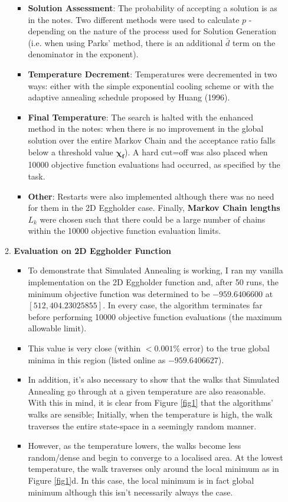 \documentclass[12pt]{article}
\begin{document}
\begin{enumerate}
\begin{enumerate}
\begin{itemize}
		\item \textbf{Solution Assessment}: The probability of accepting a solution is as in the notes. Two different methods were used to calculate $p$ - depending on the nature of the process used for Solution Generation (i.e. when using Parks' method, there is an additional $\bar{d}$ term on the denominator in the exponent).
		\item \textbf{Temperature Decrement}: Temperatures were decremented in two ways: either with the simple exponential cooling scheme or with the adaptive annealing schedule proposed by Huang (1996).
		\item \textbf{Final Temperature}: The search is halted with the enhanced method in the notes: when there is no improvement in the global solution over the entire Markov Chain and the acceptance ratio falls below a threshold value $\bm{\chi_{f}}$). A hard cut=off was also placed when 10000 objective function evaluations had occurred, as specified by the task. 
		\item \textbf{Other}: Restarts were also implemented although there was no need for them in the 2D Eggholder case. Finally, \textbf{Markov Chain lengths} $L_{k}$ were chosen such that there could be a large number of chains within the 10000 objective function evaluation limits.
	\end{itemize}
	\item \textbf{Evaluation on 2D Eggholder Function}
	\begin{itemize}
		\item To demonstrate that Simulated Annealing is working, I ran my vanilla implementation on the 2D Eggholder function and, after 50 runs, the minimum objective function was determined to be $-959.6406600$ at $[512, 404.23025855]$. In every case, the algorithm terminates far before performing 10000 objective function evaluations (the maximum allowable limit).
		\item This value is very close (within $< 0.001\%$ error) to the true global minima in this region (listed online as $−959.6406627$).
		\item In addition, it's also necessary to show that the walks that Simulated Annealing go through at a given temperature are also reasonable. With this in mind, it is clear from Figure \ref{fig1} that the algorithms' walks are sensible; Initially, when the temperature is high, the walk traverses the entire state-space in a seemingly random manner.
		\item However, as the temperature lowers, the walks become less random/dense and begin to converge to a localised area. At the lowest temperature, the walk traverses only  around the local minimum as in Figure \ref{fig1}d. In this case, the local minimum is in fact global minimum although this isn't necessarily always the case. 

\end{itemize}
\end{enumerate}
\end{enumerate}
\end{document}
